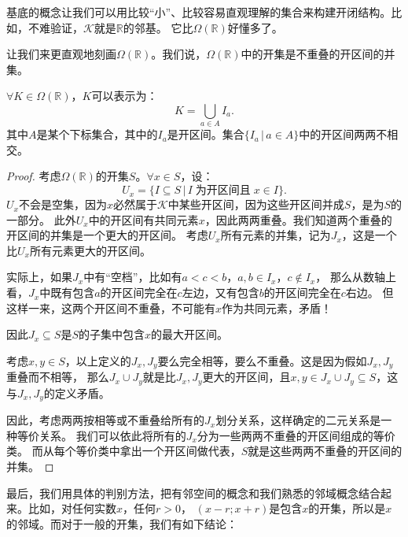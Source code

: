 \documentclass[12pt,UTF8]{ctexbook}
\begin{document}
\begin{appendix}
基底的概念让我们可以用比较“小”、比较容易直观理解的集合来构建开闭结构。比如，不难验证，$\mathcal{K}$就是$\mathbb{R}$的邻基。
它比$\Omega(\mathbb{R})$好懂多了。


让我们来更直观地刻画$\Omega(\mathbb{R})$。我们说，$\Omega(\mathbb{R})$中的开集是不重叠的开区间的并集。
\begin{tm}\label{tm:a-1-20}
    $\forall K \in \Omega(\mathbb{R})$，$K$可以表示为：
    $$ K = \bigcup_{a\in A} I_a. $$
    其中$A$是某个下标集合，其中的$I_a$是开区间。集合$\{I_a \, | \, a\in A\}$中的开区间两两不相交。
\end{tm}

\begin{proof}
    考虑$\Omega(\mathbb{R})$的开集$S$。$\forall x\in S$，设：
    $$ U_x = \{I\subseteq S \, | \, I\;\mbox{为开区间且}\;x\in I \}.$$
    $U_x$不会是空集，因为$x$必然属于$\mathcal{K}$中某些开区间，因为这些开区间并成$S$，是为$S$的一部分。
    此外$U_x$中的开区间有共同元素$x$，因此两两重叠。我们知道两个重叠的开区间的并集是一个更大的开区间。
    考虑$U_x$所有元素的并集，记为$J_x$，这是一个比$U_x$所有元素更大的开区间。
    
    实际上，如果$J_x$中有“空档”，比如有$a<c<b$，$a, b\in I_x$，$c\notin I_x$，
    那么从数轴上看，$J_x$中既有包含$a$的开区间完全在$c$左边，又有包含$b$的开区间完全在$c$右边。
    但这样一来，这两个开区间不重叠，不可能有$x$作为共同元素，矛盾！
    
    因此$J_x\subseteq S$是$S$的子集中包含$x$的最大开区间。

    考虑$x,y\in S$，以上定义的$J_x, J_y$要么完全相等，要么不重叠。这是因为假如$J_x, J_y$重叠而不相等，
    那么$J_x\cup J_y$就是比$J_x, J_y$更大的开区间，且$x,y\in J_x\cup J_y\subseteq S$，这与$J_x, J_y$的定义矛盾。

    因此，考虑两两按相等或不重叠给所有的$J_x$划分关系，这样确定的二元关系是一种等价关系。
    我们可以依此将所有的$J_x$分为一些两两不重叠的开区间组成的等价类。
    而从每个等价类中拿出一个开区间做代表，$S$就是这些两两不重叠的开区间的并集。

\end{proof}

最后，我们用具体的判别方法，把有邻空间的概念和我们熟悉的邻域概念结合起来。比如，对任何实数$x$，任何$r>0$，
$(x-r;x+r)$是包含$x$的开集，所以是$x$的邻域。而对于一般的开集，我们有如下结论：


\end{appendix}
\end{document}

